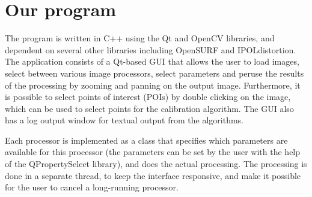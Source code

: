 \section{Our program}
\label{sec:prog}
The program is written in C++ using the Qt and OpenCV libraries, and
dependent on several other libraries including OpenSURF and IPOLdistortion.
The application consists of a Qt-based GUI that allows the user to load
images, select between various image processors, select parameters and
peruse the results of the processing by zooming and panning on the
output image. Furthermore, it is possible to select points of interest
(POIs) by double clicking on the image, which can be used to select
points for the calibration algorithm. The GUI also has a log output
window for textual output from the algorithms.

Each processor is implemented as a class that specifies which
parameters are available for this processor (the parameters can be set
by the user with the help of the QPropertySelect library), and does
the actual processing. The processing is done in a separate thread, to
keep the interface responsive, and make it possible for the user to
cancel a long-running processor.






